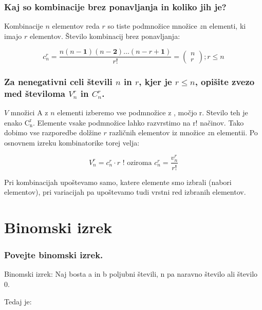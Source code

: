 \documentclass{article}
\begin{document}
\subsubsection*{Kaj so kombinacije brez ponavljanja in koliko jih je?}

Kombinacije $n$ elementov reda $r$ so tiste podmnožice množice $z \mathrm{n}$ elementi, ki imajo $r$ elementov. Število kombinacij brez ponavljanja:

$$
c_{n}^{r}=\frac{n(n-\mathbf{1})(n-\mathbf{2}) \ldots(n-r+\mathbf{1})}{r !}=\left(\begin{array}{l}
n \\
r
\end{array}\right) ; r \leq n
$$

\subsubsection*{Za nenegativni celi števili $n$ in $r$, kjer je $r \leq n$, opišite zvezo med številoma $V_{n}^{r}$ in $C_{n}^{r}$. }

$V$ množici A z $n$ elementi izberemo vse podmnožice z , močjo r. Stevilo teh je enako $\mathrm{C}_{\mathrm{n}}^{\mathrm{r}}$. Elemente vsake podmnožice lahko razvrstimo na r! načinov. Tako dobimo vse razporedbe dolžine $r$ različnih elementov iz množice $z \mathrm{n}$ elementii. Po osnovnem izreku kombinatorike torej velja:

$$
V_{n}^{r}=c_{n}^{r} \cdot r \text { ! oziroma } c_{n}^{r}=\frac{v_{n}^{r}}{r !}
$$

Pri kombinacijah upoštevamo samo, katere elemente smo izbrali (nabori elementov), pri variacijah pa upoštevamo tudi vrstni red izbranih elementov.

\section{Binomski izrek}

\subsubsection*{Povejte binomski izrek.}

Binomski izrek: Naj bosta a in b poljubni števili, n pa naravno število ali število 0.

Tedaj je:
\end{document}

